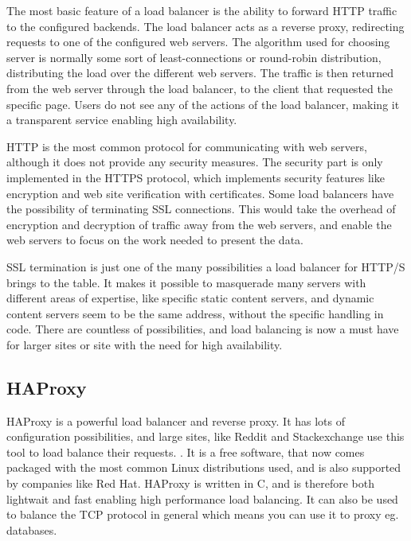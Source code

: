 The most basic feature of a load balancer is the ability to forward HTTP traffic
to the configured backends. The load balancer acts as a reverse proxy,
redirecting requests to one of the configured web servers. The algorithm used
for choosing server is normally some sort of least-connections or round-robin
distribution, distributing the load over the different web servers. The traffic
is then returned from the web server through the load balancer, to the client
that requested the specific page. Users do not see any of the actions of the
load balancer, making it a transparent service enabling high availability.

HTTP is the most common protocol for communicating with web servers, although it
does not provide any security measures. The security part is only implemented
in the HTTPS protocol, which implements security features like encryption and
web site verification with certificates. Some load balancers have the
possibility of terminating SSL connections. This would take the overhead of
encryption and decryption of traffic away from the web servers, and enable
the web servers to focus on the work needed to present the data.

SSL termination is just one of the many possibilities a load balancer for
HTTP/S brings to the table. It makes it possible to masquerade many servers
with different areas of expertise, like specific static content servers, and
dynamic content servers seem to be the same address, without the specific
handling in code. There are countless of possibilities, and load balancing is
now a must have for larger sites or site with the need for high availability.


\subsection{HAProxy}
HAProxy is a powerful load balancer and reverse proxy. It has lots of
configuration possibilities, and large sites, like Reddit and Stackexchange 
use this tool to load balance their requests. \cite{haproxy:they_use_it}. 
It is a free software, that now comes packaged with the most common Linux 
distributions used, and is also supported by companies like Red Hat. 
HAProxy is written in C, and is therefore both lightwait and fast enabling
high performance load balancing. It can also be used to balance the TCP
protocol in general which means you can use it to proxy eg. databases. 

